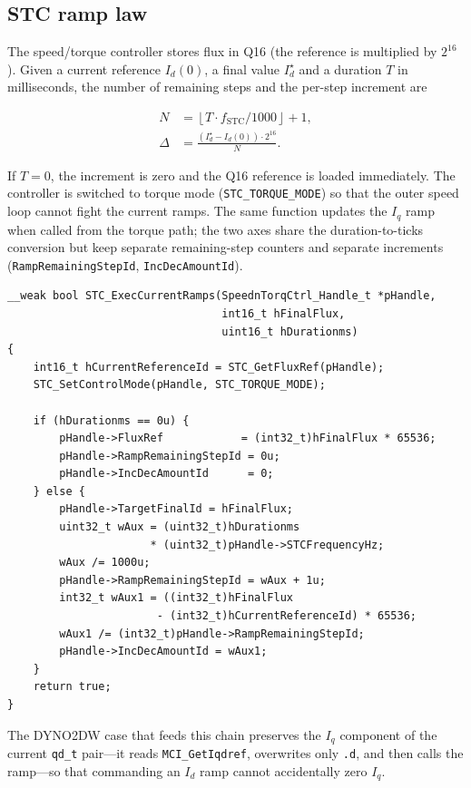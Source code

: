 \subsection{STC ramp law}
The speed/torque controller stores flux in Q16 (the reference is
multiplied by $2^{16}$). Given a current reference $I_d(0)$, a final value
$I_d^\star$ and a duration $T$ in milliseconds, the number of remaining
steps and the per-step increment are

\begin{align}
N &= \left\lfloor T \cdot f_{\mathrm{STC}} / 1000 \right\rfloor + 1, \\
\Delta &= \frac{(I_d^\star - I_d(0)) \cdot 2^{16}}{N}.
\end{align}

If $T = 0$, the increment is zero and the Q16 reference is loaded
immediately. The controller is switched to torque mode
(\texttt{STC\_TORQUE\_MODE}) so that the outer speed loop cannot fight the
current ramps. The same function updates the $I_q$ ramp when called from
the torque path; the two axes share the duration-to-ticks conversion but
keep separate remaining-step counters and separate increments
(\texttt{RampRemainingStepId}, \texttt{IncDecAmountId}).

\begin{lstlisting}[style=cstyle,caption={STC flux-ramp update (excerpt).},label=lst:stc]
__weak bool STC_ExecCurrentRamps(SpeednTorqCtrl_Handle_t *pHandle,
                                 int16_t hFinalFlux,
                                 uint16_t hDurationms)
{
    int16_t hCurrentReferenceId = STC_GetFluxRef(pHandle);
    STC_SetControlMode(pHandle, STC_TORQUE_MODE);

    if (hDurationms == 0u) {
        pHandle->FluxRef            = (int32_t)hFinalFlux * 65536;
        pHandle->RampRemainingStepId = 0u;
        pHandle->IncDecAmountId      = 0;
    } else {
        pHandle->TargetFinalId = hFinalFlux;
        uint32_t wAux = (uint32_t)hDurationms
                      * (uint32_t)pHandle->STCFrequencyHz;
        wAux /= 1000u;
        pHandle->RampRemainingStepId = wAux + 1u;
        int32_t wAux1 = ((int32_t)hFinalFlux
                       - (int32_t)hCurrentReferenceId) * 65536;
        wAux1 /= (int32_t)pHandle->RampRemainingStepId;
        pHandle->IncDecAmountId = wAux1;
    }
    return true;
}
\end{lstlisting}

The DYNO2DW case that feeds this chain preserves the $I_q$ component of
the current \texttt{qd\_t} pair---it reads \texttt{MCI\_GetIqdref},
overwrites only \texttt{.d}, and then calls the ramp---so that commanding
an $I_d$ ramp cannot accidentally zero $I_q$.


